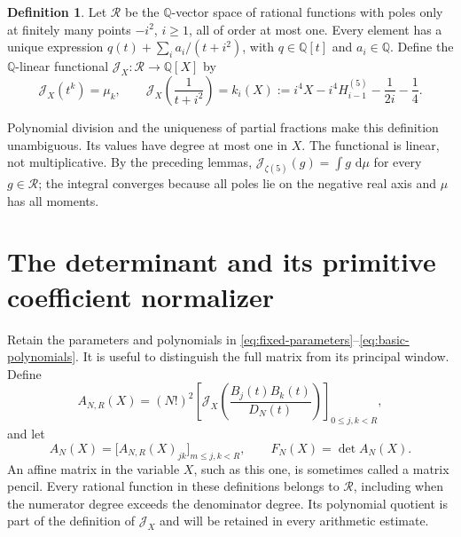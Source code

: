 \documentclass[11pt,letterpaper]{article}
\theoremstyle{definition}
\newtheorem{definition}[definition]{Definition}
\newcommand{\Q}{\mathbb Q}
\newcommand{\dd}{\,\mathrm d}
\newcommand{\J}{\mathcal J}
\begin{document}
\begin{definition}\label{def:formal-functional}
Let $\mathcal R$ be the $\Q$-vector space of rational functions with poles
only at finitely many points $-i^2$, $i\ge1$, all of order at most one.
Every element has a unique expression
$q(t)+\sum_i a_i/(t+i^2)$, with $q\in\Q[t]$ and $a_i\in\Q$.
Define the $\Q$-linear functional $\J_X:\mathcal R\to\Q[X]$ by
\begin{equation}\label{eq:formal-functional}
 \J_X(t^k)=\mu_k,\qquad
 \J_X\left(\frac1{t+i^2}\right)=k_i(X)
 :=i^4X-i^4H_{i-1}^{(5)}-\frac1{2i}-\frac14.
\end{equation}
\end{definition}

Polynomial division and the uniqueness of partial fractions make this
definition unambiguous. Its values have degree at most one in $X$.
The functional is linear, not multiplicative. By the preceding lemmas,
$\J_{\zeta(5)}(g)=\int g\,\dd\mu$ for every $g\in\mathcal R$; the integral
converges because all poles lie on the negative real axis and $\mu$ has
all moments.


\section{The determinant and its primitive coefficient normalizer}\label{sec:determinant}

Retain the parameters and polynomials in
\eqref{eq:fixed-parameters}--\eqref{eq:basic-polynomials}. It is useful
to distinguish the full matrix from its principal window. Define
\begin{equation}\label{eq:full-pencil}
 A_{N,R}(X)=(N!)^2
 \left[\J_X\left(\frac{B_j(t)B_k(t)}{D_N(t)}\right)\right]_{0\le j,k<R},
\end{equation}
and let
\begin{equation}\label{eq:window-pencil}
 A_N(X)=\bigl[A_{N,R}(X)_{jk}\bigr]_{m\le j,k<R},
 \qquad F_N(X)=\det A_N(X).
\end{equation}
An affine matrix in the variable $X$, such as this one, is sometimes
called a matrix pencil. Every rational function in these definitions
belongs to $\mathcal R$, including when the numerator degree exceeds
the denominator degree. Its polynomial quotient is part of the
definition of $\J_X$ and will be retained in every arithmetic estimate.
\end{document}

